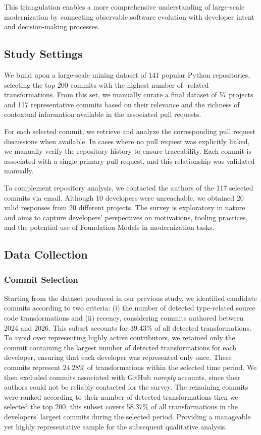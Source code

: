 This triangulation enables a more comprehensive understanding of large-scale \ths modernization by connecting observable software evolution with developer intent and decision-making processes.

\subsection{Study Settings}

We build upon a large-scale mining dataset of 141 popular Python repositories, selecting the top 200 commits with the highest number of \ths-related transformations. From this set, we manually curate a final dataset of 57 projects and 117 representative commits based on their relevance and the richness of contextual information available in the associated pull requests.

For each selected commit, we retrieve and analyze the corresponding pull request discussions when available. In cases where no pull request was explicitly linked, we manually verify the repository history to ensure traceability. Each commit is associated with a single primary pull request, and this relationship was validated manually.

To complement repository analysis, we contacted the authors of the 117 selected commits via email. Although 10 developers were unreachable, we obtained 20 valid responses from 20 different projects. The survey is exploratory in nature and aims to capture developers’ perspectives on motivations, tooling practices, and the potential use of Foundation Models in modernization tasks.

\subsection{Data Collection}

\subsubsection{Commit Selection}

Starting from the dataset produced in our previous study, we identified candidate commits according to two criteria: (i) the number of detected type-related source code transformations and (ii) recency, considering commits authored between 2024 and 2026. This subset accounts for 39.43\% of all detected transformations. To avoid over representing highly active contributors, we retained only the commit containing the largest number of detected transformations for each developer, ensuring that each developer was represented only once. These commits represent 24.28\% of transformations within the selected time period. We then excluded commits associated with GitHub \textit{noreply} accounts, since their authors could not be reliably contacted for the survey. The remaining commits were ranked according to their number of detected transformations then we selected the top 200, this subset covers 58.37\% of all transformations in the developers' largest commits during the selected period. Providing a manageable yet highly representative sample for the subsequent qualitative analysis.

